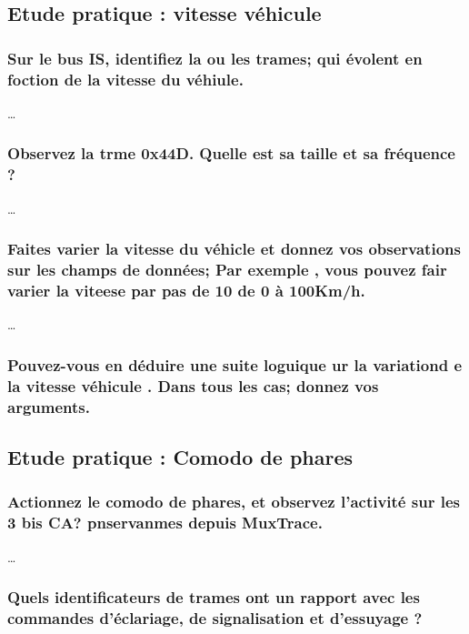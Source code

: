 \documentclass{rapportECC}
\begin{document}
\subsection{Etude pratique : vitesse véhicule}

\subsubsection*{Sur le bus IS, identifiez la ou les trames; qui évolent en foction de la vitesse du véhiule.}

\dots

\subsubsection*{Observez la trme 0x44D. Quelle est sa taille et sa fréquence ?}

\dots

\subsubsection*{Faites varier la vitesse du véhicle et donnez vos observations sur les champs de données; Par exemple , vous pouvez fair varier la viteese par pas de 10 de 0 à 100Km/h.}

\dots

\subsubsection*{Pouvez-vous en déduire une suite loguique ur la variationd e la vitesse véhicule . Dans tous les cas; donnez vos arguments.}

\subsection{Etude pratique : Comodo de phares}

\subsubsection*{Actionnez le comodo de phares, et observez l'activité sur les 3 bis CA? pnservanmes depuis MuxTrace.}

\dots

\subsubsection*{Quels identificateurs de trames ont un rapport avec les commandes d'éclariage, de signalisation et d'essuyage ?}
\end{document}
